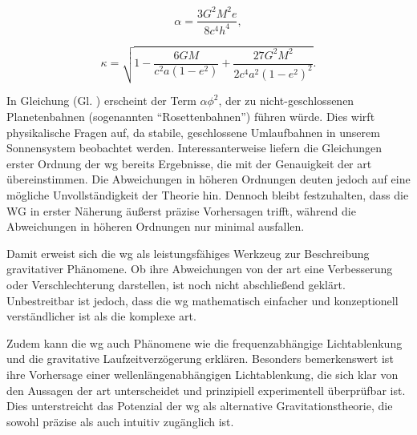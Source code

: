 \begin{equation}
\alpha = \frac{3G^2 M^2 e}{8c^4 h^4},
\end{equation}

\begin{equation}
\kappa = \sqrt{1 - \frac{6GM}{c^2 a(1 - e^2)} + \frac{27G^2 M^2}{2c^4 a^2 (1 - e^2)^2}}.
\end{equation}

In Gleichung (Gl. ) erscheint der Term $\alpha \phi^2$, der zu nicht-geschlossenen Planetenbahnen (sogenannten \enquote{Rosettenbahnen}) führen würde.
Dies wirft physikalische Fragen auf, da stabile, geschlossene Umlaufbahnen in unserem Sonnensystem beobachtet werden. Interessanterweise liefern die Gleichungen erster Ordnung
der \gls{wg} bereits Ergebnisse, die mit der Genauigkeit der \gls{art} übereinstimmen. Die Abweichungen in höheren Ordnungen deuten jedoch auf eine mögliche Unvollständigkeit der
Theorie hin. Dennoch bleibt festzuhalten, dass die WG in erster Näherung äußerst präzise Vorhersagen trifft, während die Abweichungen in höheren Ordnungen nur minimal ausfallen.

Damit erweist sich die \gls{wg} als leistungsfähiges Werkzeug zur Beschreibung gravitativer Phänomene. Ob ihre Abweichungen von der \gls{art} eine Verbesserung oder Verschlechterung
darstellen, ist noch nicht abschließend geklärt. Unbestreitbar ist jedoch, dass die \gls{wg} mathematisch einfacher und konzeptionell verständlicher ist als die komplexe \gls{art}.

Zudem kann die \gls{wg} auch Phänomene wie die frequenzabhängige Lichtablenkung und die gravitative Laufzeitverzögerung erklären. Besonders bemerkenswert ist ihre Vorhersage einer
wellenlängenabhängigen Lichtablenkung, die sich klar von den Aussagen der \gls{art} unterscheidet und prinzipiell experimentell überprüfbar ist. Dies unterstreicht das Potenzial
der \gls{wg} als alternative Gravitationstheorie, die sowohl präzise als auch intuitiv zugänglich ist.
